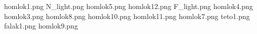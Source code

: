 homlok1.png
N_light.png
homlok5.png
homlok12.png
F_light.png
homlok4.png
homlok3.png
homlok8.png
homlok10.png
homlok11.png
homlok7.png
teto1.png
falak1.png
homlok9.png
